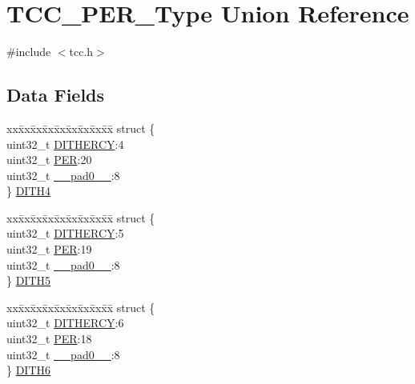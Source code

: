 \hypertarget{union_t_c_c___p_e_r___type}{}\section{T\+C\+C\+\_\+\+P\+E\+R\+\_\+\+Type Union Reference}
\label{union_t_c_c___p_e_r___type}


{\ttfamily \#include $<$tcc.\+h$>$}

\subsection*{Data Fields}
\begin{DoxyCompactItemize}
\item 
\begin{tabbing}
xx\=xx\=xx\=xx\=xx\=xx\=xx\=xx\=xx\=\kill
struct \{\\
\>uint32\_t \mbox{\hyperlink{union_t_c_c___p_e_r___type_a1e7fc84641e39de898f29ee9268f22aa}{DITHERCY}}:4\\
\>uint32\_t \mbox{\hyperlink{union_t_c_c___p_e_r___type_a3a85cb8e507302b97a36eaf1c13d0b72}{PER}}:20\\
\>uint32\_t \mbox{\hyperlink{union_t_c_c___p_e_r___type_a3e57c2ef1c3ffb36722f000cc1156824}{\_\_pad0\_\_}}:8\\
\} \mbox{\hyperlink{union_t_c_c___p_e_r___type_a63bfa82a99485cd29cbb2b5bf5ce54c7}{DITH4}}\\

\end{tabbing}\item 
\begin{tabbing}
xx\=xx\=xx\=xx\=xx\=xx\=xx\=xx\=xx\=\kill
struct \{\\
\>uint32\_t \mbox{\hyperlink{union_t_c_c___p_e_r___type_a1e7fc84641e39de898f29ee9268f22aa}{DITHERCY}}:5\\
\>uint32\_t \mbox{\hyperlink{union_t_c_c___p_e_r___type_a3a85cb8e507302b97a36eaf1c13d0b72}{PER}}:19\\
\>uint32\_t \mbox{\hyperlink{union_t_c_c___p_e_r___type_a3e57c2ef1c3ffb36722f000cc1156824}{\_\_pad0\_\_}}:8\\
\} \mbox{\hyperlink{union_t_c_c___p_e_r___type_a7ad6cd9270a3f95edd32d5f2a7b718e0}{DITH5}}\\

\end{tabbing}\item 
\begin{tabbing}
xx\=xx\=xx\=xx\=xx\=xx\=xx\=xx\=xx\=\kill
struct \{\\
\>uint32\_t \mbox{\hyperlink{union_t_c_c___p_e_r___type_a1e7fc84641e39de898f29ee9268f22aa}{DITHERCY}}:6\\
\>uint32\_t \mbox{\hyperlink{union_t_c_c___p_e_r___type_a3a85cb8e507302b97a36eaf1c13d0b72}{PER}}:18\\
\>uint32\_t \mbox{\hyperlink{union_t_c_c___p_e_r___type_a3e57c2ef1c3ffb36722f000cc1156824}{\_\_pad0\_\_}}:8\\
\} \mbox{\hyperlink{union_t_c_c___p_e_r___type_a1656e2e7cfce6c6bfdf00d786fe50d87}{DITH6}}\\


\end{tabbing}
\end{DoxyCompactItemize}
